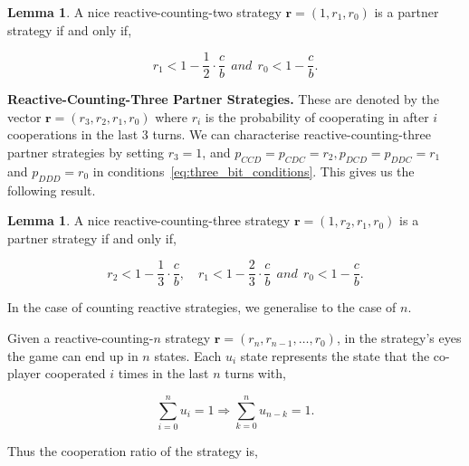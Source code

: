 \documentclass{article}
\theoremstyle{definition}
\newtheorem{lemma}[theorem]{Lemma}
\begin{document}
\begin{lemma}
A nice reactive-counting-two strategy $\mathbf{r} = (1, r_1, r_0)$ is a partner strategy if and only if,

\begin{equation}\label{eq:counting_two_bit_conditions}
  \displaystyle r_1 < 1-\frac{1}{2} \cdot \frac{c}{b} ~~and~~ r_0 < 1\!-\! \frac{c}{b}.
\end{equation}
\end{lemma}

{\bf Reactive-Counting-Three Partner Strategies.} These are denoted by the vector
$\mathbf{r}=(r_3, r_2, r_1, r_0)$ where $r_i$ is the probability of cooperating in
after $i$ cooperations in the last 3 turns. We can characterise reactive-counting-three
partner strategies by setting $r_3 = 1$, and $p_{CCD} = p_{CDC} = r_2,
p_{DCD} = p_{DDC} = r_1$ and $p_{DDD} = r_0$
in conditions~\eqref{eq:three_bit_conditions}. This gives us the following result.

\begin{lemma}
A nice reactive-counting-three strategy $\mathbf{r} = (1, r_2, r_1, r_0)$ is a partner strategy if and only if,

\begin{equation}\label{eq:counting_three_bit_conditions}
  \displaystyle r_2 < 1- \frac{1}{3} \cdot \frac{c}{b}, \quad r_1 < 1- \frac{2}{3} \cdot \frac{c}{b} ~~and~~ r_0 < 1\!-\! \frac{c}{b}.
\end{equation}
\end{lemma}

In the case of counting reactive strategies, we generalise to the case of $n$.


Given a reactive-counting-$n$ strategy $\mathbf{r} = (r_n, r_{n-1}, \dots,
r_0)$, in the strategy's eyes the game can end up in $n$ states. Each $u_{i}$
state represents the state that the co-player cooperated $i$ times in the last
$n$ turns with,

\begin{equation}\label{Eq:normalization_counting}
  \sum_{i=0}^{n} u_{i} = 1 \Rightarrow \sum_{k=0}^{n} u_{n - k} = 1.
\end{equation}

Thus the cooperation ratio of the strategy is,
\end{document}
